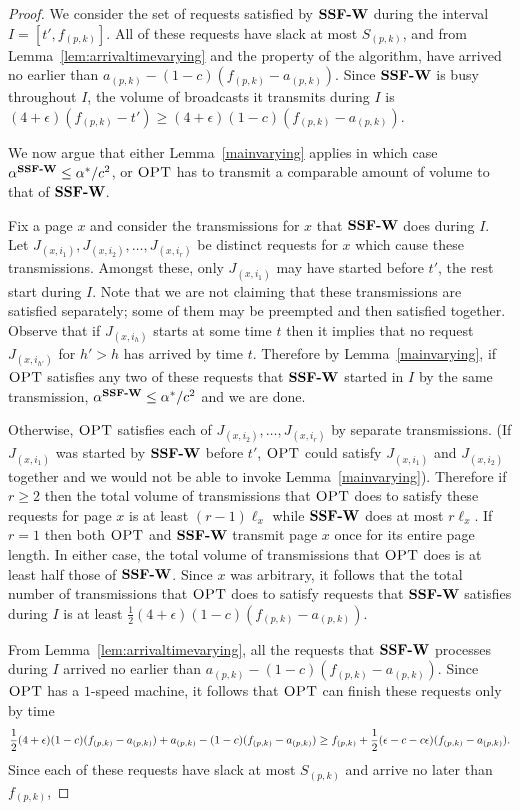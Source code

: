 \documentclass[11pt]{article}
\newcommand{\opt}{\textrm{\sc OPT}}
\newcommand{\eps}{\epsilon}
\newcommand{\st}{S} \newcommand{\Algorithm}[1]{{\texttt{\bf{#1}}}} \newcommand{\sbg}{\Algorithm{SSF-W}} \newcommand{\sug}{\Algorithm{SSF}} \newcommand{\mmug}{\Algorithm{SSF-ID}}
\begin{document}
\begin{proof}
  We consider the set of requests satisfied by $\sbg$ during the
  interval $I = [t', f_{(p,k)}]$. All of these requests have slack at
  most $\st_{(p,k)}$, and from Lemma~\ref{lem:arrivaltimevarying} and
  the property of the algorithm, have arrived no earlier than
  $a_{(p,k)} - (1-c)(f_{(p,k)} - a_{(p,k)})$. Since $\sbg$ is busy throughout
  $I$, the volume of broadcasts it transmits during $I$
  is $(4 + \epsilon)(f_{(p,k)} - t') \ge (4+\eps)(1-c)(f_{(p,k)} -
  a_{(p,k)})$.

  We now argue that either Lemma~\ref{mainvarying} applies in which
  case $\alpha^{\sbg} \le \alpha^*/c^2$, or $\opt$ has to transmit
  a comparable amount of volume to that of $\sbg$.

  Fix a page $x$ and consider the transmissions for $x$ that $\sbg$
  does during $I$. Let $J_{(x,i_1)}, J_{(x,i_2)}, \ldots, J_{(x,i_r)}$
  be distinct requests for $x$ which cause these
  transmissions. Amongst these, only $J_{(x,i_1)}$ may have started
  before $t'$, the rest start during $I$.  Note that we are not
  claiming that these transmissions are satisfied separately; some of
  them may be preempted and then satisfied together. Observe that if
  $J_{(x,i_h)}$ starts at some time $t$ then it implies that no
  request $J_{(x,i_{h'})}$ for $h' > h$ has arrived by time $t$.
  Therefore by Lemma~\ref{mainvarying}, if $\opt$ satisfies any two of
  these requests that $\sbg$ started in $I$ by the same transmission,
  $\alpha^{\sbg} \le \alpha^*/c^2$ and we are done.

  Otherwise, $\opt$ satisfies each of $J_{(x,i_2)}, \ldots,
  J_{(x,i_r)}$ by separate transmissions. (If $J_{(x,i_1)}$ was
  started by $\sbg$ before $t'$, $\opt$ could satisfy $J_{(x,i_1)}$
  and $J_{(x,i_2)}$ together and we would not be able to invoke
  Lemma~\ref{mainvarying}). Therefore if $r \ge 2$ then the total
  volume of transmissions that $\opt$ does to satisfy these requests
  for page $x$ is at least $(r-1)\ell_x$ while $\sbg$ does at most
  $r\ell_x$.  If $r = 1$ then both $\opt$ and $\sbg$ transmit page $x$ once for its entire page length. In either case, the total volume of transmissions
  that $\opt$ does is at least half those of $\sbg$. Since $x$ was
  arbitrary, it follows that the total number of transmissions that
  $\opt$ does to satisfy requests that $\sbg$ satisfies during $I$
  is at least $\frac{1}{2} (4+\eps)(1-c)(f_{(p,k)} -  a_{(p,k)})$.

  From Lemma~\ref{lem:arrivaltimevarying}, all the requests that
  $\sbg$ processes during $I$ arrived no earlier than $a_{(p,k)} -
  (1-c)(f_{(p,k)} - a_{(p,k)})$. Since $\opt$ has a $1$-speed machine,
  it follows that $\opt$ can finish these requests only by time
  \[
  {1 \over 2}(4+\eps)(1-c)(f_{(p,k)} - a_{(p,k)}) + a_{(p,k)} -
  (1-c)(f_{(p,k)} - a_{(p,k)}) \ge f_{(p,k)} + {1 \over 2}(\eps - c
  - c\eps)(f_{(p,k)} - a_{(p,k)}).
  \]
  Since each of these requests have slack at most $\st_{(p,k)}$ and arrive
  no later than $f_{(p,k)}$,


\end{proof}
\end{document}
